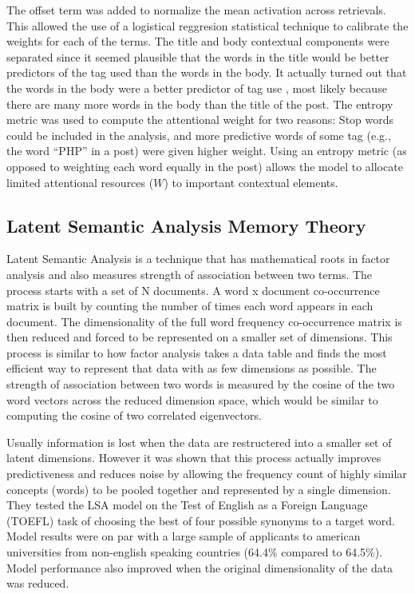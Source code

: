 \documentclass[man,floatsintext]{apa6}
\begin{document}
The offset term was added to normalize the mean activation across retrievals.
This allowed the use of a logistical reggresion statistical technique to calibrate the weights for each of the terms.
The title and body contextual components were separated since it seemed plausible that the words in the title would be better predictors of the tag used than the words in the body.
It actually turned out that the words in the body were a better predictor of tag use \parencite{Stanley2013}, most likely because there are many more words in the body than the title of the post.
The entropy metric was used to compute the attentional weight for two reasons:
Stop words could be included in the analysis, and more predictive words of some tag (e.g., the word ``PHP'' in a post) were given higher weight.
Using an entropy metric (as opposed to weighting each word equally in the post) allows the model to allocate limited attentional resources ($W$) to important contextual elements.

\subsection{Latent Semantic Analysis Memory Theory}

Latent Semantic Analysis \parencite{Landauer1997} is a technique that has mathematical roots in factor analysis and also measures strength of association between two terms.
The process starts with a set of N documents.
A word x document co-occurrence matrix is built by counting the number of times each word appears in each document.
The dimensionality of the full word frequency co-occurrence matrix is then reduced and forced to be represented on a smaller set of dimensions.
This process is similar to how factor analysis takes a data table and finds the most efficient way to represent that data with as few dimensions as possible.
The strength of association between two words is measured by the cosine of the two word vectors across the reduced dimension space, which would be similar to computing the cosine of two correlated eigenvectors.

Usually information is lost when the data are restructered into a smaller set of latent dimensions.
However it was shown that this process actually improves predictiveness and reduces noise by allowing the frequency count of highly similar concepts (words) to be pooled together and represented by a single dimension.
They tested the LSA model on the Test of English as a Foreign Language (TOEFL) task of choosing the best of four possible synonyms to a target word.
Model results were on par with a large sample of applicants to american universities from non-english speaking countries (64.4\% compared to 64.5\%).
Model performance also improved when the original dimensionality of the data was reduced.
\end{document}
